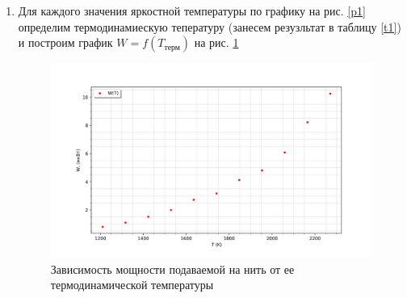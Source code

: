 \documentclass[a4paper]{article}
\begin{document}
\begin{enumerate}
    \item Для каждого значения яркостной температуры по графику на рис. \ref{p1} определим термодинамиескую 
    тепературу (занесем резузльтат в таблицу \ref{t1}) и построим график $W = f(T_{\text{терм}})$ на рис. \ref{graph1}
    \begin{figure}[h]
        \begin{center}
        \includegraphics[scale = 0.5]{W(T).png}
        \caption{Зависимость мощности подаваемой на нить от ее термодинамической температуры}
        \label{graph1}
        \end{center}
    \end{figure}


\end{enumerate}
\end{document}

